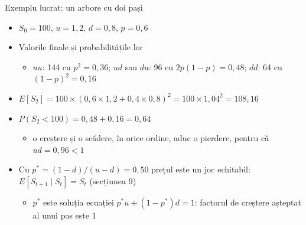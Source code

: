\begin{frame}{Exemplu lucrat: un arbore cu doi pași}
\itemsize{\footnotesize}
\begin{itemize}
    \item $S_0 = 100$, $u = 1{,}2$, $d = 0{,}8$, $p = 0{,}6$
    \item Valorile finale și probabilitățile lor
    \begin{itemize}
        \item $uu$: 144 cu $p^2 = 0{,}36$; $ud$ sau $du$: 96 cu $2p(1-p) = 0{,}48$; $dd$: 64 cu $(1-p)^2 = 0{,}16$
    \end{itemize}
    \item $E[S_2] = 100 \times (0{,}6 \times 1{,}2 + 0{,}4 \times 0{,}8)^2 = 100 \times 1{,}04^2 = 108{,}16$
    \item $P(S_2 < 100) = 0{,}48 + 0{,}16 = 0{,}64$
    \begin{itemize}
        \item o creștere și o scădere, în orice ordine, aduc o pierdere, pentru că $ud = 0{,}96 < 1$
    \end{itemize}
    \item Cu $p^* = (1 - d)/(u - d) = 0{,}50$ prețul este un joc echitabil: $E[S_{t+1} \mid S_t] = S_t$ (secțiunea 9)
    \begin{itemize}
        \item $p^*$ este soluția ecuației $p^*u + (1 - p^*)d = 1$: factorul de creștere așteptat al unui pas este 1
    \end{itemize}
\end{itemize}
\end{frame}

